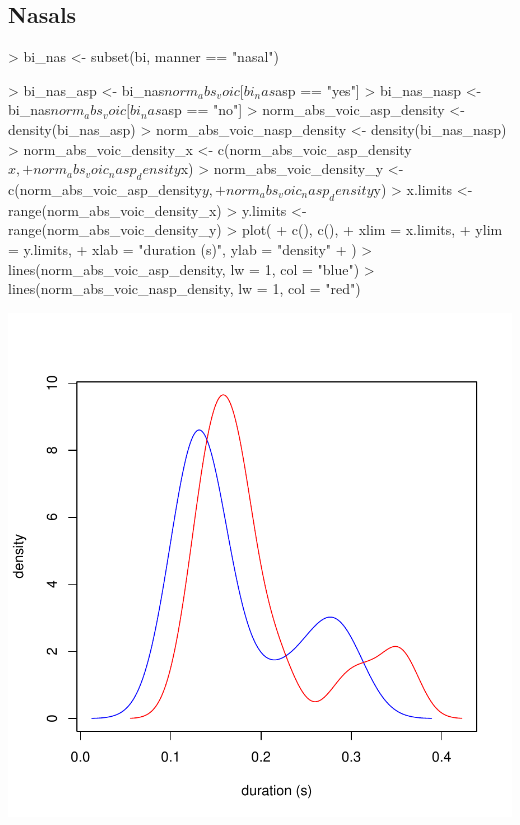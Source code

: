 \documentclass[a4paper,11pt]{article}
\begin{document}
\subsection{Nasals}

\begin{Schunk}
\begin{Sinput}
> bi_nas <- subset(bi, manner == "nasal")
\end{Sinput}
\end{Schunk}

\begin{Schunk}
\begin{Sinput}
> bi_nas_asp <- bi_nas$norm_abs_voic[bi_nas$asp == "yes"]
> bi_nas_nasp <- bi_nas$norm_abs_voic[bi_nas$asp == "no"]
> norm_abs_voic_asp_density <- density(bi_nas_asp)
> norm_abs_voic_nasp_density <- density(bi_nas_nasp)
> norm_abs_voic_density_x <- c(norm_abs_voic_asp_density$x, 
+                                   norm_abs_voic_nasp_density$x)
> norm_abs_voic_density_y <- c(norm_abs_voic_asp_density$y, 
+                                   norm_abs_voic_nasp_density$y)
> x.limits <- range(norm_abs_voic_density_x)
> y.limits <- range(norm_abs_voic_density_y)
> plot(
+ c(), c(),
+ xlim = x.limits,
+ ylim = y.limits,
+ xlab = "duration (s)", ylab = "density"
+ )
> lines(norm_abs_voic_asp_density, lw = 1, col = "blue")
> lines(norm_abs_voic_nasp_density, lw = 1, col = "red")
\end{Sinput}
\end{Schunk}
\includegraphics{analysis-024}
\end{document}
